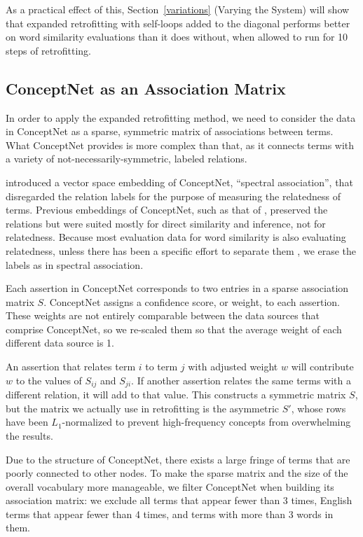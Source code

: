 \documentclass[11pt,letterpaper]{article}
\begin{document}
As a practical effect of this, Section~\ref{variations} (Varying the System)
will show that expanded retrofitting with self-loops added to the diagonal
performs better on word similarity evaluations than it does without, when
allowed to run for 10 steps of retrofitting.


\subsection{ConceptNet as an Association Matrix}

In order to apply the expanded retrofitting method, we need to consider the data in
ConceptNet as a sparse, symmetric matrix of associations between terms. What
ConceptNet provides is more complex than that, as it connects terms with a
variety of not-necessarily-symmetric, labeled relations.

 introduced a vector space embedding of ConceptNet,
``spectral association'', that disregarded the relation labels for the purpose
of measuring the relatedness of terms. Previous embeddings of ConceptNet, such
as that of , preserved the relations but were
suited mostly for direct similarity and inference, not for relatedness. Because
most evaluation data for word similarity is also evaluating relatedness, unless
there has been a specific effort to separate them \cite{agirre2009similarity},
we erase the labels as in spectral association.

Each assertion in ConceptNet corresponds to two entries in a sparse
association matrix $S$.  ConceptNet assigns a confidence score, or weight, to
each assertion.  These weights are not entirely comparable between the data
sources that comprise ConceptNet, so we re-scaled them so that the average
weight of each different data source is 1.

An assertion that relates term $i$ to term $j$ with adjusted weight $w$ will
contribute $w$ to the values of $S_{ij}$ and $S_{ji}$. If another assertion
relates the same terms with a different relation, it will add to that value.
This constructs a symmetric matrix $S$, but the matrix we actually use in
retrofitting is the asymmetric $S'$, whose rows have been $L_1$-normalized to
prevent high-frequency concepts from overwhelming the results.

Due to the structure of ConceptNet, there exists a large fringe of terms that are
poorly connected to other nodes. To make the sparse matrix and the size of the
overall vocabulary more manageable, we filter ConceptNet when building its
association matrix: we exclude all terms that appear fewer than 3 times, English
terms that appear fewer than 4 times, and terms with more than 3 words in them.
\end{document}
